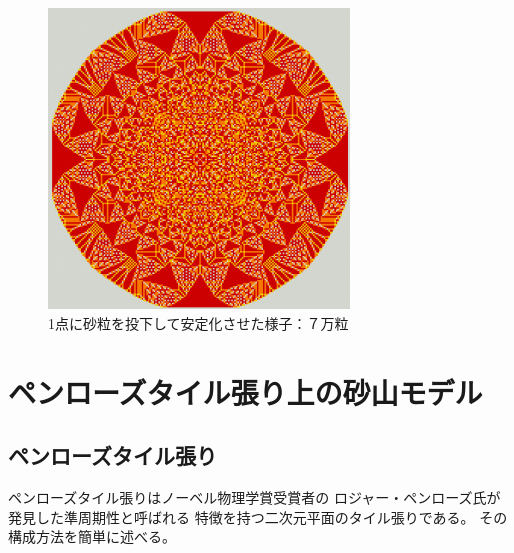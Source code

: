 \documentclass[lualatex,12pt,ja=standard]{bxjsreport}
\begin{document}
\begin{center}
 \begin{figure}[H]
  \begin{center}
   \includegraphics[bb=0 0 896 893,clip,width=8cm]{figures/onePoint70000.png}
  \end{center}
  \caption{1点に砂粒を投下して安定化させた様子：７万粒}
  \label{fig:onePoint70000}
 \end{figure}
\end{center}

\chapter{ペンローズタイル張り上の砂山モデル}

\section{ペンローズタイル張り}
ペンローズタイル張りはノーベル物理学賞受賞者の
ロジャー・ペンローズ氏が発見した準周期性と呼ばれる
特徴を持つ二次元平面のタイル張りである。
その構成方法を簡単に述べる。
\end{document}
